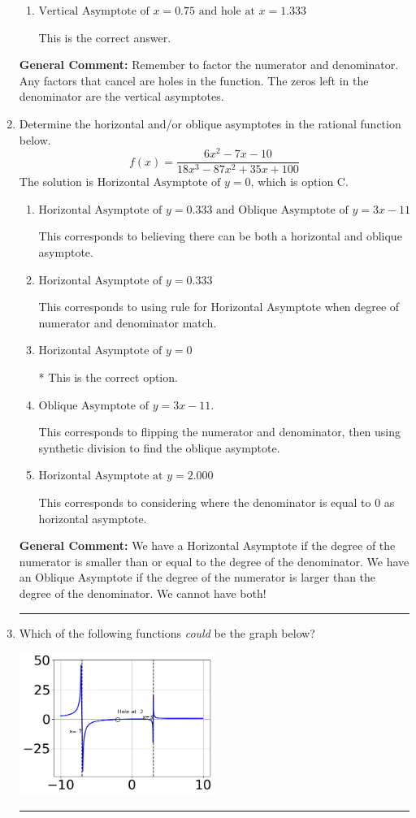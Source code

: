 \documentclass{extbook}[14pt]
\newcommand{\litem}[1]{\item #1

\rule{\textwidth}{0.4pt}}
\begin{document}
\begin{enumerate}
{\begin{enumerate}[label=\Alph*.]
This corresponds to considering where the denominator is equal to 0 as holes.
\item \( \text{Vertical Asymptote of } x = 0.75 \text{ and hole at } x = 1.333 \)

This is the correct answer.
\end{enumerate}

\textbf{General Comment:} Remember to factor the numerator and denominator. Any factors that cancel are holes in the function. The zeros left in the denominator are the vertical asymptotes.
}
\litem{
Determine the horizontal and/or oblique asymptotes in the rational function below.
\[ f(x) = \frac{6x^{2} -7 x -10}{18x^{3} -87 x^{2} +35 x + 100} \]The solution is \( \text{Horizontal Asymptote of } y = 0 \), which is option C.\begin{enumerate}[label=\Alph*.]
\item \( \text{Horizontal Asymptote of } y = 0.333 \text{ and Oblique Asymptote of } y = 3x -11 \)

This corresponds to believing there can be both a horizontal and oblique asymptote.
\item \( \text{Horizontal Asymptote of } y = 0.333  \)

This corresponds to using rule for Horizontal Asymptote when degree of numerator and denominator match.
\item \( \text{Horizontal Asymptote of } y = 0 \)

* This is the correct option.
\item \( \text{Oblique Asymptote of } y = 3x -11. \)

This corresponds to flipping the numerator and denominator, then using synthetic division to find the oblique asymptote.
\item \( \text{Horizontal Asymptote at } y = 2.000 \)

This corresponds to considering where the denominator is equal to 0 as horizontal asymptote.
\end{enumerate}

\textbf{General Comment:} We have a Horizontal Asymptote if the degree of the numerator is smaller than or equal to the degree of the denominator. We have an Oblique Asymptote if the degree of the numerator is larger than the degree of the denominator. We cannot have both!
}
\litem{
Which of the following functions \textit{could} be the graph below?

\begin{center}
    \includegraphics[width=0.5\textwidth]{../Figures/identifyGraphOfRationalFunctionCopyA.png}
\end{center}


}
\end{enumerate}
\end{document}

